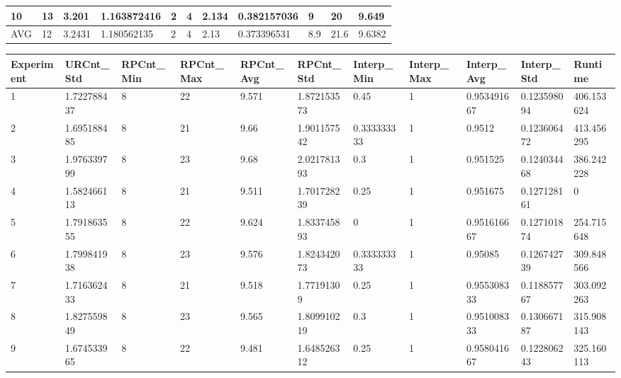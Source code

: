 \begin{table}[H]
\begin{adjustbox}{max width=380pt,keepaspectratio,angle=90}
\begin{tabular}{|l|l|l|l|l|l|l|l|l|l|l|}
					10         & 13        & 3.201     & 1.163872416 & 2            & 4            & 2.134        & 0.382157036  & 9          & 20         & 9.649      \\ \hline\hline
					AVG        & 12        & 3.2431    & 1.180562135 & 2            & 4            & 2.13         & 0.373396531  & 8.9        & 21.6       & 9.6382     \\ \hline
				\end{tabular}	
			\end{adjustbox}
			\begin{adjustbox}{max width=380pt,keepaspectratio,angle=90}
				\begin{tabular}{|l|l|l|l|l|l|l|l|l|l|l|}
					\rowcolor[HTML]{EFEFEF} 
					\hline
					Experiment & URCnt\_Std  & RPCnt\_Min & RPCnt\_Max & RPCnt\_Avg & RPCnt\_Std  & Interp\_Min & Interp\_Max & Interp\_Avg & Interp\_Std & Runtime     \\ \hline
					1          & 1.722788437 & 8          & 22         & 9.571      & 1.872153573 & 0.45        & 1           & 0.953491667 & 0.123598094 & 406.153624  \\ \hline
					2          & 1.695188485 & 8          & 21         & 9.66       & 1.901157542 & 0.333333333 & 1           & 0.9512      & 0.123606472 & 413.456295  \\ \hline
					3          & 1.976339799 & 8          & 23         & 9.68       & 2.021781393 & 0.3         & 1           & 0.951525    & 0.124034468 & 386.242228  \\ \hline
					4          & 1.582466113 & 8          & 21         & 9.511      & 1.701728239 & 0.25        & 1           & 0.951675    & 0.127128161 & 0           \\ \hline
					5          & 1.791863555 & 8          & 22         & 9.624      & 1.833745893 & 0           & 1           & 0.951616667 & 0.127101874 & 254.715648  \\ \hline
					6          & 1.799841938 & 8          & 23         & 9.576      & 1.824342073 & 0.333333333 & 1           & 0.95085     & 0.126742739 & 309.848566  \\ \hline
					7          & 1.716362433 & 8          & 21         & 9.518      & 1.77191309  & 0.25        & 1           & 0.955308333 & 0.118857767 & 303.092263  \\ \hline
					8          & 1.827559849 & 8          & 23         & 9.565      & 1.809910219 & 0.3         & 1           & 0.951008333 & 0.130667187 & 315.908143  \\ \hline
					9          & 1.674533965 & 8          & 22         & 9.481      & 1.648526312 & 0.25        & 1           & 0.958041667 & 0.122806243 & 325.160113  \\ \hline

\end{tabular}
\end{adjustbox}
\end{table}
